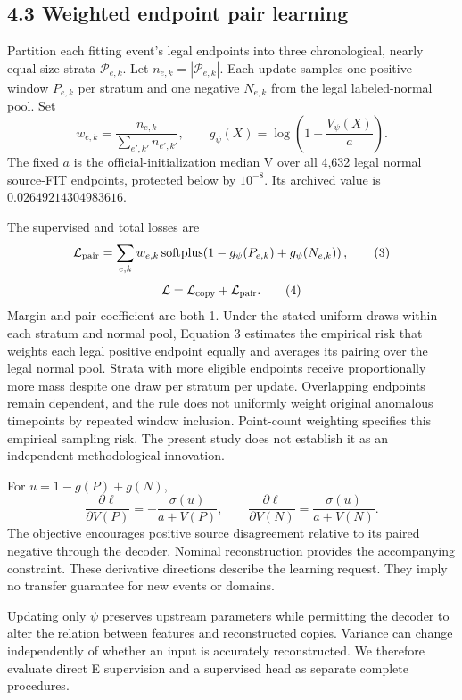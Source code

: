 \documentclass[
  english,
  10pt,
]{article}
\begin{document}
\subsection{4.3 Weighted endpoint pair
learning}\label{weighted-endpoint-pair-learning}

Partition each fitting event's legal endpoints into three chronological,
nearly equal-size strata \(\mathcal P_{e,k}\). Let
\(n_{e,k}=|\mathcal P_{e,k}|\). Each update samples one positive window
\(P_{e,k}\) per stratum and one negative \(N_{e,k}\) from the legal
labeled-normal pool. Set \[
w_{e,k}=\frac{n_{e,k}}{\sum_{e',k'}n_{e',k'}},
\qquad
g_\psi(X)=\log\!\left(1+\frac{V_\psi(X)}a\right).
\] The fixed \(a\) is the official-initialization median V over all
4,632 legal normal source-FIT endpoints, protected below by \(10^{-8}\).
Its archived value is \(0.02649214304983616\).

The supervised and total losses are \[
\mathcal L_{\rm pair}
=\sum_{e,k}w_{e,k}\operatorname{softplus}
\!\left(1-g_\psi(P_{e,k})+g_\psi(N_{e,k})\right),
\tag{3}
\] \[
\mathcal L=\mathcal L_{\rm copy}+\mathcal L_{\rm pair}.
\tag{4}
\] Margin and pair coefficient are both 1. Under the stated uniform
draws within each stratum and normal pool, Equation 3 estimates the
empirical risk that weights each legal positive endpoint equally and
averages its pairing over the legal normal pool. Strata with more
eligible endpoints receive proportionally more mass despite one draw per
stratum per update. Overlapping endpoints remain dependent, and the rule
does not uniformly weight original anomalous timepoints by repeated
window inclusion. Point-count weighting specifies this empirical
sampling risk. The present study does not establish it as an independent
methodological innovation.

For \(u=1-g(P)+g(N)\), \[
\frac{\partial\ell}{\partial V(P)}
=-\frac{\sigma(u)}{a+V(P)},\qquad
\frac{\partial\ell}{\partial V(N)}
=\frac{\sigma(u)}{a+V(N)}.
\tag{5}
\] The objective encourages positive source disagreement relative to its
paired negative through the decoder. Nominal reconstruction provides the
accompanying constraint. These derivative directions describe the
learning request. They imply no transfer guarantee for new events or
domains.

Updating only \(\psi\) preserves upstream parameters while permitting
the decoder to alter the relation between features and reconstructed
copies. Variance can change independently of whether an input is
accurately reconstructed. We therefore evaluate direct E supervision and
a supervised head as separate complete procedures.
\end{document}
